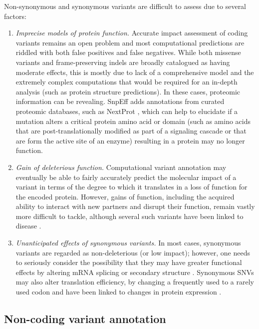 Non-synonymous and synonymous variants are difficult to assess due to several factors:

\begin{enumerate}[label=\roman*]
	
	\item \textit{Imprecise models of protein function.} Accurate impact assessment of coding variants remains an open problem and most computational predictions are riddled with both false positives and false negatives. While both missense variants and frame-preserving indels are broadly catalogued as having moderate effects, this is mostly due to lack of a comprehensive model and the extremely complex computations that would be required for an in-depth analysis (such as protein structure predictions). In these cases, proteomic information can be revealing. SnpEff adds annotations from curated proteomic databases, such as NextProt  \cite{lane2012nextprot}, which can help to elucidate if a mutation alters a critical protein amino acid or domain (such as amino acids that are post-translationally modified as part of a signaling cascade or that are form the active site of an enzyme) resulting in a protein may no longer function.
	
	\item \textit{Gain of deleterious function.} Computational variant annotation may eventually be able to fairly accurately predict the molecular impact of a variant in terms of the degree to which it translates in a loss of function for the encoded protein. However, gains of function, including the acquired ability to interact with new partners and disrupt their function, remain vastly more difficult to tackle, although several such variants have been linked to disease \cite{whitcomb1996hereditary}.
	
	\item \textit{Unanticipated effects of synonymous variants.} In most cases, synonymous variants are regarded as non-deleterious (or low impact); however, one needs to seriously consider the possibility that they may have greater functional effects by altering mRNA splicing  \cite{coulombe2009fine} or secondary structure  \cite{sabarinathan2013rnasnp}. Synonymous SNVs may also alter translation efficiency, by changing a frequently used to a rarely used codon and have been linked to changes in protein expression  \cite{sauna2011understanding}.
	
\end{enumerate}

\subsection{Non-coding variant annotation}

